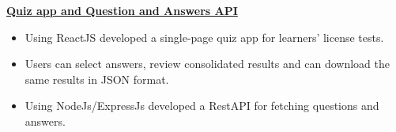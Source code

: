 \textbf{\href{https://lltestpracticeapp.herokuapp.com/}{Quiz app and Question and Answers API}} \par
\begin{itemize}
	\item Using ReactJS developed a single-page quiz app for learners' license tests.
	\item Users can select answers, review consolidated results and can download the same results in JSON format.
	\item Using NodeJs/ExpressJs developed a RestAPI for fetching questions and answers.
\end{itemize}\vspace{0.1cm} \par